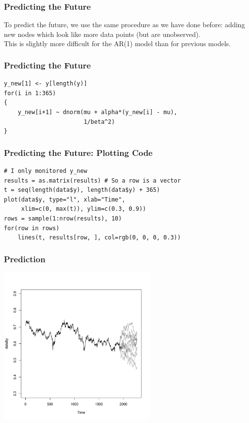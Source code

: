 \documentclass{beamer}
\begin{document}
\begin{frame}[fragile]
\frametitle{Predicting the Future}

To predict the future, we use the same procedure as we have done before:
adding new nodes which look like more data points (but are unobserved).\\[0.5em]

This is slightly more difficult for the AR(1) model than for previous models.

\end{frame}



\begin{frame}[fragile]
\frametitle{Predicting the Future}

\begin{verbatim}
y_new[1] <- y[length(y)]
for(i in 1:365)
{
    y_new[i+1] ~ dnorm(mu + alpha*(y_new[i] - mu),
                       1/beta^2)
}
\end{verbatim}


\end{frame}

\begin{frame}[fragile]
\frametitle{Predicting the Future: Plotting Code}

\begin{verbatim}
# I only monitored y_new
results = as.matrix(results) # So a row is a vector
t = seq(length(data$y), length(data$y) + 365)
plot(data$y, type="l", xlab="Time",
     xlim=c(0, max(t)), ylim=c(0.3, 0.9))
rows = sample(1:nrow(results), 10)
for(row in rows)
    lines(t, results[row, ], col=rgb(0, 0, 0, 0.3))
\end{verbatim}


\end{frame}



\begin{frame}[fragile]
\frametitle{Prediction}
\begin{center}
\includegraphics[width=0.6\textwidth]{images/nzd_prediction.pdf}
\end{center}

\end{frame}
\end{document}
